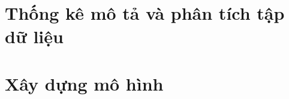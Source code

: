 \documentclass[14pt, a4paper]{article}
\numberwithin{equation}{section}
\numberwithin{figure}{section}
\theoremstyle{sltheorem}
\theoremstyle{soltheorem}
\begin{document}

            




    \cleardoublepage
    \tableofcontents
    \newpage
    \listoffigures
    \cleardoublepage

    \section{Thống kê mô tả và phân tích tập dữ liệu}
    
    

    

    

    \section{Xây dựng mô hình}

    

    
    
    
    
    
    
    
    
    

    
    
    

    

    
\end{document}
